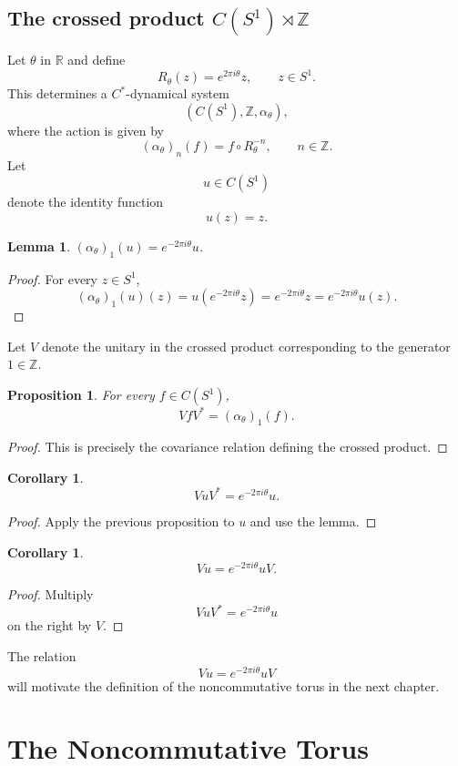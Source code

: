 \documentclass{book}
\newtheorem{lemma}[definition]{Lemma}
\newtheorem{proposition}[definition]{Proposition}
\newtheorem{corollary}[definition]{Corollary}
\begin{document}
\section{The crossed product \texorpdfstring{\(C(S^1)\rtimes \mathbb{Z}\)}{CS1xZ}}
Let \(\theta\) in \(\mathbb {R}\) and define
\[
R_\theta(z)=e^{2\pi i\theta}z,
\qquad z\in S^1.
\]
This determines a $C^*$-dynamical system
\[
(C(S^1),\mathbb Z,\alpha_\theta),
\]
where the action is given by
\[
(\alpha_\theta)_n(f)=f\circ R_\theta^{-n},\qquad n\in\mathbb Z.
\]
Let
\[
u\in C(S^1)
\]
denote the identity function
\[
u(z)=z.
\]
\begin{lemma}
\((\alpha_\theta)_1(u)=e^{-2\pi i\theta}u\).
\end{lemma}
\begin{proof}
For every $z\in S^1$,
\[
(\alpha_\theta)_1(u)(z)
=
u(e^{-2\pi i\theta}z)
=
e^{-2\pi i\theta}z
=
e^{-2\pi i\theta}u(z).
\]
\end{proof}
Let $V$ denote the unitary in the crossed product corresponding to the generator $1\in\mathbb Z$.
\begin{proposition}
For every $f\in C(S^1)$,
\[
VfV^*
=
(\alpha_\theta)_1(f).
\]
\end{proposition}
\begin{proof}
This is precisely the covariance relation defining the crossed product.
\end{proof}
\begin{corollary}
\[
VuV^*
=
e^{-2\pi i\theta}u.
\]
\end{corollary}
\begin{proof}
Apply the previous proposition to $u$ and use the lemma.
\end{proof}
\begin{corollary}\label{corollary:344}
\[
Vu=e^{-2\pi i\theta}uV.
\]
\end{corollary}
\begin{proof}
Multiply
\[
VuV^*
=
e^{-2\pi i\theta}u
\]
on the right by $V$.
\end{proof}
The relation
\[
Vu=e^{-2\pi i\theta}uV
\]
will motivate the definition of the noncommutative torus in the next chapter.





\chapter{The Noncommutative Torus}
\end{document}
